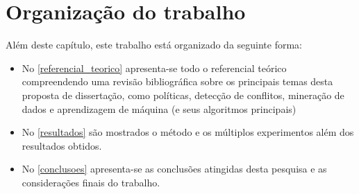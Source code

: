 \documentclass[
	12pt,				%
	openright,			%
	oneside,			%
	a4paper,			%
	english,			%
	french,				%
	spanish,			%
	brazil				%
	]{abntex2}
\begin{document}
\section{Organização do trabalho}
Além deste capítulo, este trabalho está organizado da seguinte forma:
\begin{itemize}	
	\item No \autoref{referencial_teorico} apresenta-se todo o referencial teórico compreendendo uma revisão bibliográfica sobre os principais temas desta proposta de dissertação, como políticas, detecção de conflitos, mineração de dados e aprendizagem de máquina (e seus algoritmos principais)
	\item No \autoref{resultados} são mostrados o método e os múltiplos experimentos além dos resultados obtidos.
	\item No \autoref{conclusoes} apresenta-se as conclusões atingidas desta pesquisa e as considerações finais do trabalho.
\end{itemize}
\clearpage

%
%

%
%
%
\end{document}
